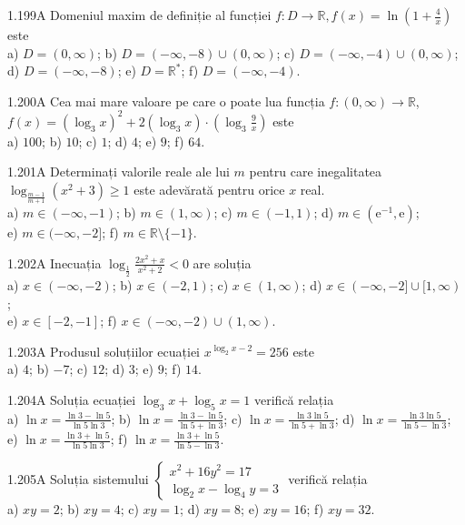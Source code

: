 \documentclass[11pt]{article}
\begin{document}
1.199A Domeniul maxim de definiție al funcției $f: D \rightarrow \mathbb{R}, f(x)=\ln \left(1+\frac{4}{x}\right)$ este\\ a) $D=(0, \infty)$; b) $D=(-\infty,-8) \cup(0, \infty)$; c) $D=(-\infty,-4) \cup(0, \infty)$;\\ d) $D=(-\infty,-8)$; e) $D=\mathbb{R}^{*}$; f) $D=(-\infty,-4)$. 

1.200A Cea mai mare valoare pe care o poate lua funcția $f:(0, \infty) \rightarrow \mathbb{R}$,\\$f(x)=\left(\log _{3} x\right)^{2}+2\left(\log _{3} x\right) \cdot\left(\log _{3} \frac{9}{x}\right)$ este\\ a) $100$; b) $10$; c) $1$; d) $4$; e) $9$; f) $64$.

1.201A Determinați valorile reale ale lui $m$ pentru care inegalitatea $\log _{\frac{m-1}{m+1}}\left(x^{2}+3\right) \geq 1$ este adevărată pentru orice $x$ real.\\ a) $m \in(-\infty,-1)$; b) $m \in(1, \infty)$; c) $m \in(-1,1)$; d) $m \in\left(\mathrm{e}^{-1}, \mathrm{e}\right)$;\\ e) $m \in(-\infty,-2]$; f) $m \in \mathbb{R} \setminus\{-1\}$.

1.202A Inecuația $\log _{\frac{1}{2}} \frac{2 x^{2}+x}{x^{2}+2}<0$ are soluția\\ a) $x \in(-\infty,-2)$; b) $x \in(-2,1)$; c) $x \in(1, \infty)$; d) $x \in(-\infty,-2] \cup[1, \infty)$;\\ e) $x \in[-2,-1]$; f) $x \in(-\infty,-2) \cup(1, \infty)$.

1.203A Produsul soluțiilor ecuației $x^{\log _{2} x-2}=256$ este\\ a) $4$; b) $-7$; c) $12$; d) $3$; e) $9$; f) $14$.

1.204A Soluția ecuației $\log _{3} x+\log _{5} x=1$ verifică relația\\ a) $\ln x=\frac{\ln 3-\ln 5}{\ln 5 \ln 3}$; b) $\ln x=\frac{\ln 3-\ln 5}{\ln 5+\ln 3}$; c) $\ln x=\frac{\ln 3 \ln 5}{\ln 5+\ln 3}$; d) $\ln x=\frac{\ln 3 \ln 5}{\ln 5-\ln 3}$;\\ e) $\ln x=\frac{\ln 3+\ln 5}{\ln 5 \ln 3}$; f) $\ln x=\frac{\ln 3+\ln 5}{\ln 5-\ln 3}$.

1.205A Soluția sistemului $\left\{\begin{array}{l}x^{2}+16 y^{2}=17 \\ \log _{2} x-\log _{4} y=3\end{array}\right.$ verifică relația\\ a) $x y=2$; b) $x y=4$; c) $x y=1$; d) $x y=8$; e) $x y=16$; f) $x y=32$.
\end{document}
